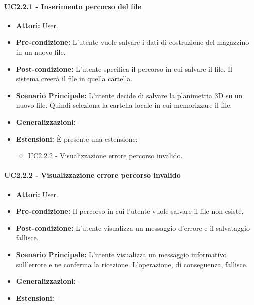 \paragraph{UC2.2.1 - Inserimento percorso del file}
\begin{itemize}
    \item \textbf{Attori:} User.
    \item \textbf{Pre-condizione:} L'utente vuole salvare i dati di costruzione del magazzino in un nuovo file.
    \item \textbf{Post-condizione:} L'utente specifica il percorso in cui salvare il file. Il sistema creerà il file in quella cartella.
    \item \textbf{Scenario Principale:} L'utente decide di salvare la planimetria 3D su un nuovo file. Quindi seleziona la cartella locale in cui memorizzare il file.
    \item \textbf{Generalizzazioni:} -
    \item \textbf{Estensioni:} È presente una estensione:
    \begin{itemize}
        \item UC2.2.2 - Visualizzazione errore percorso invalido.
    \end{itemize}
\end{itemize}

\paragraph{UC2.2.2 - Visualizzazione errore percorso invalido}
\begin{itemize}
    \item \textbf{Attori:} User.
    \item \textbf{Pre-condizione:} Il percorso in cui l'utente vuole salvare il file non esiste.
    \item \textbf{Post-condizione:} L'utente visualizza un messaggio d'errore e il salvataggio fallisce.
    \item \textbf{Scenario Principale:} L'utente visualizza un messaggio informativo sull'errore e ne conferma la ricezione. L'operazione, di conseguenza, fallisce.
    \item \textbf{Generalizzazioni:} -
    \item \textbf{Estensioni:} -
\end{itemize}

